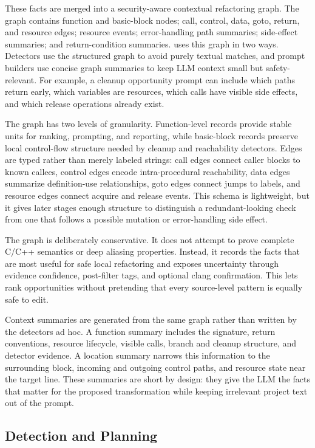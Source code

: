 These facts are merged into a security-aware contextual refactoring graph. The
graph contains function and basic-block nodes; call, control, data, goto,
return, and resource edges; resource events; error-handling path summaries;
side-effect summaries; and return-condition summaries. \SysName{} uses this graph
in two ways. Detectors use the structured graph to avoid purely textual matches,
and prompt builders use concise graph summaries to keep LLM context small but
safety-relevant. For example, a cleanup opportunity prompt can include which
paths return early, which variables are resources, which calls have visible side
effects, and which release operations already exist.

The graph has two levels of granularity. Function-level records provide stable
units for ranking, prompting, and reporting, while basic-block records preserve
local control-flow structure needed by cleanup and reachability detectors. Edges
are typed rather than merely labeled strings: call edges connect caller blocks
to known callees, control edges encode intra-procedural reachability, data edges
summarize definition-use relationships, goto edges connect jumps to labels, and
resource edges connect acquire and release events. This schema is lightweight,
but it gives later stages enough structure to distinguish a redundant-looking
check from one that follows a possible mutation or error-handling side effect.

The graph is deliberately conservative. It does not attempt to prove complete
C/C++ semantics or deep aliasing properties. Instead, it records the facts that
are most useful for safe local refactoring and exposes uncertainty through
evidence confidence, post-filter tags, and optional clang confirmation. This
lets \SysName{} rank opportunities without pretending that every source-level
pattern is equally safe to edit.

Context summaries are generated from the same graph rather than written by the
detectors ad hoc. A function summary includes the signature, return conventions,
resource lifecycle, visible calls, branch and cleanup structure, and detector
evidence. A location summary narrows this information to the surrounding block,
incoming and outgoing control paths, and resource state near the target line.
These summaries are short by design: they give the LLM the facts that matter for
the proposed transformation while keeping irrelevant project text out of the
prompt.

\subsection{Detection and Planning}
\label{sec:design-detection-planning}

